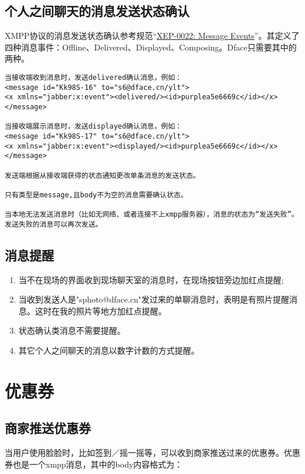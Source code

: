 \subsection{个人之间聊天的消息发送状态确认}
XMPP协议的消息发送状态确认参考规范“\href{http://xmpp.org/extensions/xep-0022.html}{XEP-0022: Message Events}”。其定义了四种消息事件：Offline、Delivered、Displayed、Composing。Dface只需要其中的两种。

\begin{verbatim}
当接收端收到消息时，发送delivered确认消息，例如：
<message id="Kk98S-16" to="s6@dface.cn/ylt">
<x xmlns="jabber:x:event"><delivered/><id>purplea5e6669c</id></x>
</message>

当接收端展示消息时，发送displayed确认消息，例如：
<message id="Kk98S-17" to="s6@dface.cn/ylt">
<x xmlns="jabber:x:event"><displayed/><id>purplea5e6669c</id></x>
</message>

发送端根据从接收端获得的状态通知更改单条消息的发送状态。

只有类型是message,且body不为空的消息需要确认状态。

当本地无法发送消息时（比如无网络、或者连接不上xmpp服务器），消息的状态为“发送失败”。发送失败的消息可以再次发送。

\end{verbatim}

\subsection{消息提醒}
\begin{enumerate}
\item 当不在现场的界面收到现场聊天室的消息时，在现场按钮旁边加红点提醒;
\item 当收到发送人是"sphoto@dface.cn"发过来的单聊消息时，表明是有照片提醒消息。这时在我的照片等地方加红点提醒。
\item 状态确认类消息不需要提醒。
\item 其它个人之间聊天的消息以数字计数的方式提醒。
\end{enumerate}






\section{优惠券}

\subsection{商家推送优惠券}
当用户使用脸脸时，比如签到／摇一摇等，可以收到商家推送过来的优惠券。优惠券也是一个xmpp消息，其中的body内容格式为：

